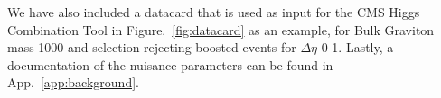 \begin{itemize}






We have also included a datacard that is used as input for the CMS Higgs Combination Tool in Figure.~\ref{fig:datacard} as an example, for Bulk Graviton mass 1000 and selection rejecting boosted events for $\Delta\eta$ 0-1. Lastly, a documentation of the nuisance parameters can be found in App.~\ref{app:background}.


\end{itemize}
